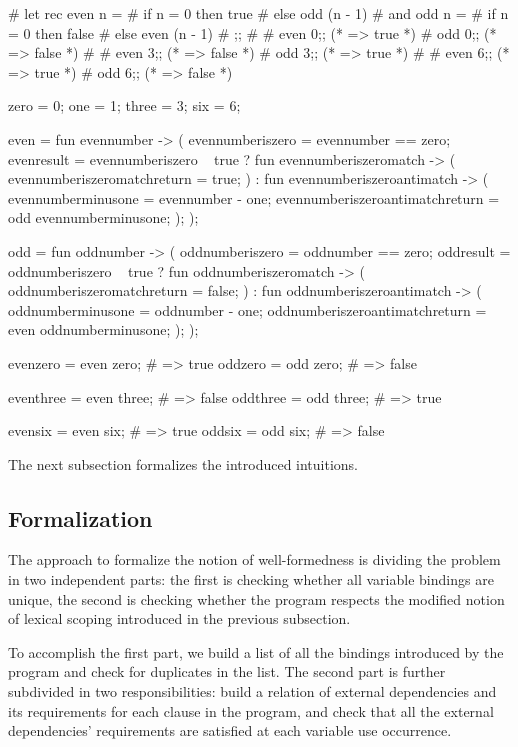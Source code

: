 \documentclass[nocopyright]{sigplanconf}
\begin{document}
\begin{plang}
# let rec even n =
#   if n = 0 then true
#   else odd (n - 1)
# and odd n =
#   if n = 0 then false
#   else even (n - 1)
# ;;
#
# even 0;; (* => true *)
# odd 0;; (* => false *)
#
# even 3;; (* => false *)
# odd 3;; (* => true *)
#
# even 6;; (* => true *)
# odd 6;; (* => false *)

zero = 0;
one = 1;
three = 3;
six = 6;

even = fun evennumber -> (
  evennumberiszero = evennumber == zero;
  evenresult = evennumberiszero ~ true ?
    fun evennumberiszeromatch -> (
      evennumberiszeromatchreturn = true;
    ) :
    fun evennumberiszeroantimatch -> (
      evennumberminusone = evennumber - one;
      evennumberiszeroantimatchreturn = odd evennumberminusone;
    );
);

odd = fun oddnumber -> (
  oddnumberiszero = oddnumber == zero;
  oddresult = oddnumberiszero ~ true ?
    fun oddnumberiszeromatch -> (
      oddnumberiszeromatchreturn = false;
    ) :
    fun oddnumberiszeroantimatch -> (
      oddnumberminusone = oddnumber - one;
      oddnumberiszeroantimatchreturn = even oddnumberminusone;
    );
);

evenzero = even zero; # => true
oddzero = odd zero; # => false

eventhree = even three; # => false
oddthree = odd three; # => true

evensix = even six; # => true
oddsix = odd six; # => false
\end{plang}

The next subsection formalizes the introduced intuitions.

\subsection{Formalization}

The approach to formalize the notion of well-formedness is dividing the problem in two independent parts: the first is checking whether all variable bindings are unique, the second is checking whether the program respects the modified notion of lexical scoping introduced in the previous subsection.

To accomplish the first part, we build a list of all the bindings introduced by the program and check for duplicates in the list.  The second part is further subdivided in two responsibilities: build a relation of external dependencies and its requirements for each clause in the program, and check that all the external dependencies' requirements are satisfied at each variable use occurrence.
\end{document}
